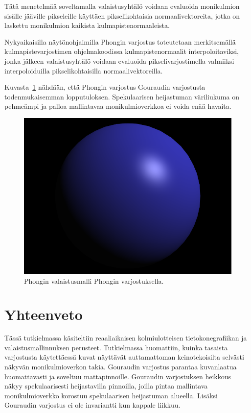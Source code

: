 \documentclass[finnish]{tktltiki2}
\theoremstyle{definition}
\theoremstyle{remark}
\begin{document}
Tätä menetelmää soveltamalla valaistusyhtälö voidaan evaluoida monikulmion sisälle jääville pikseleille käyttäen pikselikohtaisia normaalivektoreita, jotka on laskettu monikulmion kaikista kulmapistenormaaleista.

Nykyaikaisilla näytönohjaimilla Phongin varjostus toteutetaan merkitsemällä kulmapistevarjostimen ohjelmakoodissa kulmapistenormaalit interpoloitaviksi, jonka jälkeen valaistusyhtälö voidaan 
evaluoida pikselivarjostimella valmiiksi interpoloiduilla pikselikohtaisilla normaalivektoreilla.

Kuvasta~\ref{fig:Phong_valaistus} nähdään, että Phongin varjostus Gouraudin varjostusta todenmukaisemman lopputuloksen. Spekulaarisen heijastuman väriliukuma on pehmeämpi ja palloa mallintavaa monikulmioverkkoa ei voida enää havaita.

\begin{figure}[h]
\centering
\includegraphics[scale=0.6]{img/phong_spec_crop.png}
\caption{Phongin valaistusmalli Phongin varjostuksella.}
\label{fig:Phong_valaistus}
\end{figure}

\newpage
\section{Yhteenveto}
Tässä tutkielmassa käsiteltiin reaaliaikaisen kolmiulotteisen tietokonegrafiikan ja valaistusmallinnuksen perusteet. Tutkielmassa huomattiin, kuinka tasaista varjostusta käytettäessä kuvat näyttävät auttamattoman keinotekoisilta selvästi näkyvän monikulmioverkon takia. Gouraudin varjostus parantaa kuvanlaatua huomattavasti ja soveltuu mattapinnoille. Gouraudin varjostuksen heikkous näkyy spekulaarisesti heijastavilla pinnoilla, joilla pintaa mallintava monikulmioverkko korostuu spekulaarisen heijastuman alueella. Lisäksi Gouraudin varjostus ei ole invariantti kun kappale liikkuu.
\end{document}
